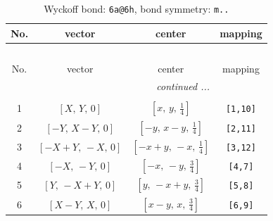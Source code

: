 \documentclass[fleqn,8pt]{jsarticle}
\begin{document}
\begin{longtable}{cccc}
\caption{Wyckoff bond: {\tt 6a@6h}, bond symmetry: {\tt m..}}
 \\
 \hline \hline
No. & vector & center & mapping \\ \hline \endfirsthead

\multicolumn{3}{l}{\tablename\ \thetable{}} \\
 \hline \hline
No. & vector & center & mapping \\ \hline \endhead

 \hline \hline
\multicolumn{3}{r}{\footnotesize\it continued ...} \\ \endfoot

 \hline \hline
\multicolumn{3}{r}{} \\ \endlastfoot

1 & $\left[ X,\, Y,\, 0 \right]$ & $\left[ x,\, y,\, \frac{1}{4} \right]$ & {\tt [1,10]} \\ \hline
2 & $\left[ - Y,\, X - Y,\, 0 \right]$ & $\left[ - y,\, x - y,\, \frac{1}{4} \right]$ & {\tt [2,11]} \\ \hline
3 & $\left[ - X + Y,\, - X,\, 0 \right]$ & $\left[ - x + y,\, - x,\, \frac{1}{4} \right]$ & {\tt [3,12]} \\ \hline
4 & $\left[ - X,\, - Y,\, 0 \right]$ & $\left[ - x,\, - y,\, \frac{3}{4} \right]$ & {\tt [4,7]} \\ \hline
5 & $\left[ Y,\, - X + Y,\, 0 \right]$ & $\left[ y,\, - x + y,\, \frac{3}{4} \right]$ & {\tt [5,8]} \\ \hline
6 & $\left[ X - Y,\, X,\, 0 \right]$ & $\left[ x - y,\, x,\, \frac{3}{4} \right]$ & {\tt [6,9]} \\
\end{longtable}
\renewcommand{\arraystretch}{1.2}
\end{document}
